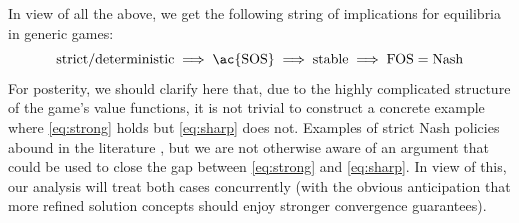 In view of all the above, we get the following string of implications for equilibria in generic games:
\begin{equation}
\textrm{strict}
	/ \textrm{deterministic}
	\implies \textrm{\ac{SOS}}
	\implies \textrm{stable}
	\implies \textrm{FOS}
	= \textrm{Nash}
\end{equation}
For posterity, we should clarify here that, due to the highly complicated structure of the game's value functions, it is not trivial to construct a concrete example where \eqref{eq:strong} holds but \eqref{eq:sharp} does not.
Examples of strict Nash policies abound in the literature \cite{LRS19,solan2015stochastic}, but we are not otherwise aware of an argument that could be used to close the gap between \eqref{eq:strong} and \eqref{eq:sharp}.
In view of this, our analysis will treat both cases concurrently (with the obvious anticipation that more refined solution concepts should enjoy stronger convergence guarantees).
